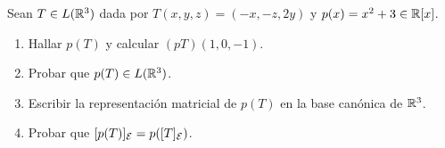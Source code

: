 \item Sean $T\in L(\mathbb{R}^3)$ dada por $T(x,y,z)=(-x,-z,2y)$ y $p(x)=x^2+3\in\mathbb{R}[x]$.
    \begin{enumerate}
        \item Hallar $p(T)$ y calcular $(pT)(1,0,-1)$.
            \begin{mdframed}[style=s]
                
            \end{mdframed}
        \item Probar que $p(T)\in L(\mathbb{R}^3)$.
            \begin{mdframed}[style=s]
                
            \end{mdframed}
        \item Escribir la representación matricial de $p(T)$ en la base canónica de $\mathbb{R}^3$.
            \begin{mdframed}[style=s]
                
            \end{mdframed}
        \item Probar que $[p(T)]_{\mathcal{E}}=p([T]_{\mathcal{E}})$.
            \begin{mdframed}[style=s]
                
            \end{mdframed}
    \end{enumerate}